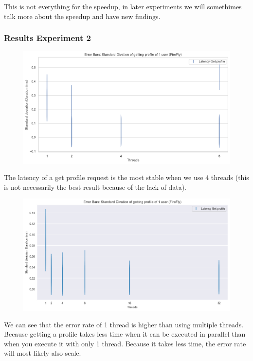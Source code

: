 \documentclass[a4paper]{article}
\begin{document}
This is not everything for the speedup, in later experiments we will somethimes talk more about the speedup and have new findings. 

\subsubsection{Results Experiment 2}
\begin{figure}[H]
	\centering
	\includegraphics[width = \linewidth]{Images/LatencyStdFirefly.png}
	\caption{}
\end{figure}
The latency of a get profile request is the most stable when we use 4 threads (this is not necessarily the best result because of the lack of data). 
\begin{figure}[H]
	\centering
	\includegraphics[width = \linewidth]{Images/LatencyStd.png}
	\caption{}
\end{figure}
We can see that the error rate of 1 thread is higher than using multiple threads. Because getting a profile takes less time when it can be executed in parallel than when you execute it with only 1 thread. Because it takes less time, the error rate will most likely also scale. 
\end{document}
